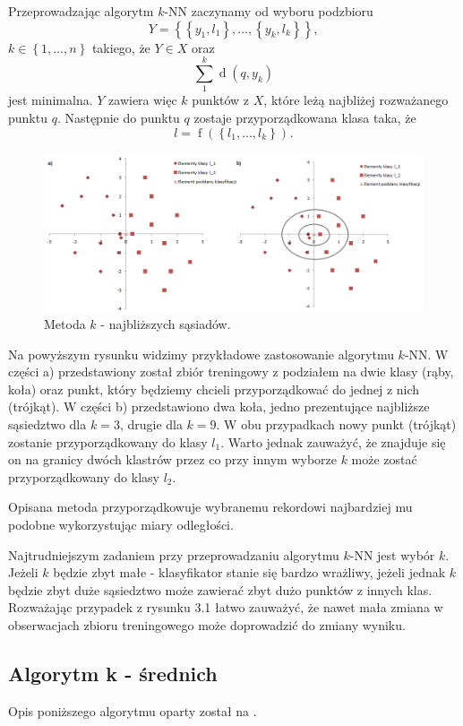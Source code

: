 \documentclass[12pt,a4paper]{report}
\newcommand{\set}[1]{\left\lbrace {#1} \right\rbrace}
\newcommand{\distance}[2]{\operatorname{d}\left({#1}, {#2} \right)}
\newcommand{\f}[2][]{\operatorname{f}\left( {#2} \right)_{#1}}
\begin{document}
Przeprowadzając algorytm $k$-NN zaczynamy od wyboru podzbioru
$$
\mathit{Y}=\set{\set{y_1,l_1},\ldots,\set{y_k,l_k}}, 
$$
$k\in\set{1,\ldots,n}$ takiego, że $\mathit{Y} \in \mathit{X}$ oraz 
$$
\sum_1^k \distance{q}{y_k}
$$ 
jest minimalna. $\mathit{Y}$ zawiera więc $k$ punktów z $\mathit{X}$, które leżą najbliżej rozważanego punktu $q$. Następnie do punktu $q$ zostaje przyporządkowana klasa taka, że $$
l=\f{\set{l_1,\ldots,l_k}}.
$$
\begin{center}
\begin{figure}[H]
\centering
\includegraphics[scale=0.5]{kNN.PNG} 
\caption{Metoda $k$ - najbliższych sąsiadów.}
\end{figure}
\end{center}

Na powyższym rysunku widzimy przykładowe zastosowanie algorytmu $k$-NN. W części a) przedstawiony został zbiór treningowy z podziałem na dwie klasy (rąby, koła) oraz punkt, który będziemy chcieli przyporządkować do jednej z nich (trójkąt). W części b) przedstawiono dwa koła, jedno prezentujące najbliższe sąsiedztwo dla $k = 3$, drugie dla $k = 9$. W obu przypadkach nowy punkt (trójkąt) zostanie przyporządkowany do klasy $l_1$. Warto jednak zauważyć, że znajduje się on na granicy dwóch klastrów przez co przy innym wyborze $k$ może zostać przyporządkowany do klasy $l_2$.

Opisana metoda przyporządkowuje wybranemu rekordowi najbardziej mu podobne wykorzystując miary odległości.

Najtrudniejszym zadaniem przy przeprowadzaniu algorytmu $k$-NN jest wybór $k$. Jeżeli $k$ będzie zbyt małe - klasyfikator stanie się bardzo wrażliwy, jeżeli jednak $k$ będzie zbyt duże sąsiedztwo może zawierać zbyt dużo punktów z innych klas. Rozważając przypadek z rysunku 3.1 łatwo zauważyć, że nawet mała zmiana w obserwacjach zbioru treningowego może doprowadzić do zmiany wyniku.

\subsection{Algorytm k - średnich} 
Opis poniższego algorytmu oparty został na {\citep[Sec 2.3.1]{ascgdpds}}.
\end{document}
